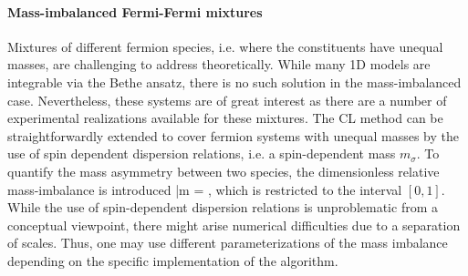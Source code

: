 \documentclass[../main.tex]{subfiles}
\begin{document}
\paragraph{Mass-imbalanced Fermi-Fermi mixtures}
{Mixtures of different fermion species, i.e. where the constituents have unequal masses, are challenging to address theoretically. While many 1D models are integrable via the Bethe ansatz, there is no such solution in the mass-imbalanced case. Nevertheless, these systems are of great interest as there are a number of experimental realizations available for these mixtures. The CL method can be straightforwardly extended to cover fermion systems with unequal masses by the use of spin dependent dispersion relations, i.e. a spin-dependent mass $m_\sigma$. To quantify the mass asymmetry between two species, the dimensionless relative mass-imbalance is introduced
%
\beq
  \bar m = ,
\eeq
%
which is restricted to the interval $[0,1]$. While the use of spin-dependent dispersion relations is unproblematic from a conceptual viewpoint, there might arise numerical difficulties due to a separation of scales. Thus, one may use different parameterizations of the mass imbalance depending on the specific implementation of the algorithm.
}
\end{document}
